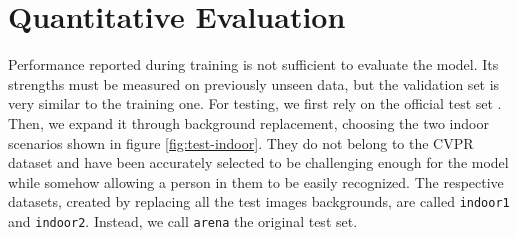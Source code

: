 \section{Quantitative Evaluation}
\label{sec:evaluation-quantitative}

Performance reported during training is not sufficient to evaluate the model. Its strengths must be measured on previously unseen data, but the validation set is very similar to the training one. For testing, we first rely on the official test set \cite{mantegazza2019visionbased}. Then, we expand it through background replacement, choosing the two indoor scenarios shown in figure \ref{fig:test-indoor}. They do not belong to the CVPR dataset and have been accurately selected to be challenging enough for the model while somehow allowing a person in them to be easily recognized. The respective datasets, created by replacing all the test images backgrounds, are called \texttt{indoor1} and \texttt{indoor2}. Instead, we call \texttt{arena} the original test set.

